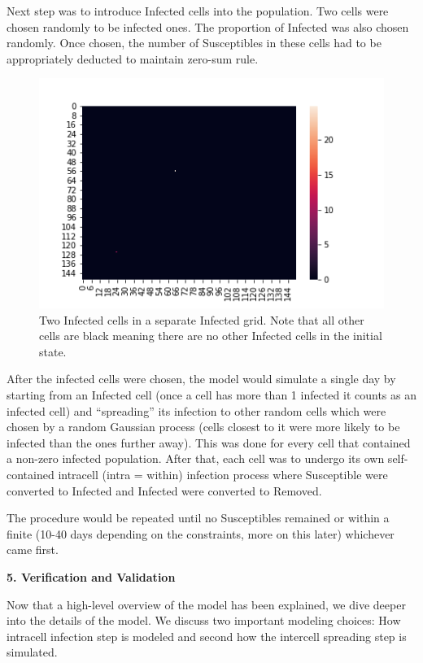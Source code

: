 \documentclass[a4paper]{article}
\begin{document}
Next step was to introduce Infected cells into the population. Two cells were chosen
randomly to be infected ones. The proportion of Infected was also chosen
randomly. Once chosen, the number of Susceptibles in these cells had to be
appropriately deducted to maintain zero-sum rule.

\begin{figure}[ht]
  \includegraphics[scale=0.70]{../infected_cells.png}
  \centering
  \caption{Two Infected cells in a separate Infected grid. Note that all other cells are black meaning there
  are no other Infected cells in the initial state.}
\end{figure}

After the infected cells were chosen, the model would simulate a single day by starting
from an Infected cell (once a cell has more than 1 infected it counts as an
infected cell) and ``spreading'' its infection to other random cells which
were chosen by a random Gaussian process (cells closest to it were more likely
to be infected than the ones further away). This was done for every cell that
contained a non-zero infected population. After that, each cell was to undergo
its own self-contained intracell (intra = within) infection process where Susceptible were converted to
Infected and Infected were converted to Removed. 

The procedure would be repeated until no Susceptibles remained or within a
finite (10-40 days depending on the constraints, more on this later) whichever came first.

\newpage

\begin{center}
  \textbf{5. Verification and Validation}
\end{center}

Now that a high-level overview of the model has been explained, we dive deeper
into the details of the model. We discuss two important modeling choices: How
intracell infection step is modeled and second how the intercell spreading step is
simulated.
\bigskip
\end{document}
